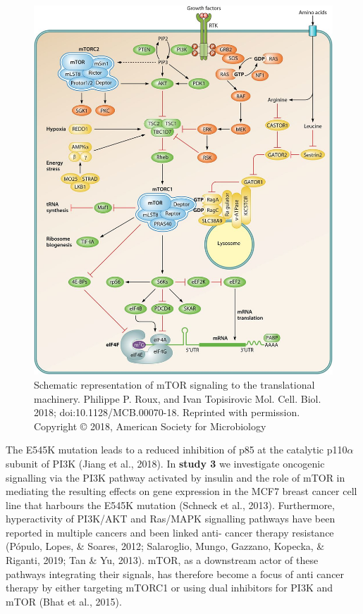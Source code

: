 \documentclass[
  12pt,
  openany]{book}
\begin{document}
\begin{figure}
  \includegraphics{./figures/mTORsignal.jpg}
  \caption{Schematic representation of mTOR signaling to the translational machinery. Philippe P. Roux, and Ivan Topisirovic Mol. Cell. Biol. 2018; doi:10.1128/MCB.00070-18. Reprinted with permission. Copyright © 2018, American Society for Microbiology
 \label{fig:mtorsignal}}
\end{figure}

The E545K mutation leads to a reduced inhibition of p85 at the catalytic p110\(\alpha\) subunit of PI3K (Jiang et al., 2018). In \textbf{study 3} we investigate oncogenic signalling via the PI3K pathway activated by insulin and the role of mTOR in mediating the resulting effects on gene expression in the MCF7 breast cancer cell line that harbours the E545K mutation (Schneck et al., 2013). Furthermore, hyperactivity of PI3K/AKT and Ras/MAPK signalling pathways have been reported in multiple cancers and been linked anti- cancer therapy resistance (Pópulo, Lopes, \& Soares, 2012; Salaroglio, Mungo, Gazzano, Kopecka, \& Riganti, 2019; Tan \& Yu, 2013). mTOR, as a downstream actor of these pathways integrating their signals, has therefore become a focus of anti cancer therapy by either targeting mTORC1 or using dual inhibitors for PI3K and mTOR (Bhat et al., 2015).
\end{document}
